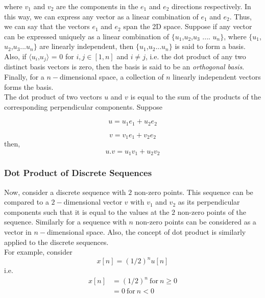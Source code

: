     where $v_1$ and $v_2$ are the components in the $e_1$ and $e_2$ directions respectively. In this way, we can express any vector as a linear combination of $e_1$ and $e_2$. Thus, we can say that the vectors $e_1$ and $e_2$ span the 2D space.
    Suppose if any vector can be expressed uniquely as a linear combination of $\{ u_1$,$u_2$,$u_3$ .... $u_n \}$, where $\{ u_1$,$u_2$,$u_3$...$u_n \}$ are linearly independent, then $\{ u_1$,$u_2$...$u_n \}$ is said to form a basis.\\
\noindent
Also, if $\langle u_i$,$u_j \rangle$ = 0 for $i,j \in [1,n]$ and $i \neq j$, i.e. the dot product of any two distinct basis vectors is zero,  then the basis is said to be an \emph{orthogonal basis}. Finally, for a $n-$dimensional space, a collection of $n$ linearly independent vectors forms the basis.\\
\noindent
The dot product of two vectors $u$ and $v$ is equal to the sum of the products of the corresponding perpendicular components. Suppose

				\begin{equation*}u = u_1e_1 + u_2e_2\end{equation*}
                        
                        \begin{equation*}v = v_1e_1 + v_2e_2\end{equation*} 
\noindent                        
                        then,\begin{equation*} u.v = u_1v_1 + u_2v_2\end{equation*}
           
\subsubsection{Dot Product of Discrete Sequences}           
Now, consider a discrete sequence with $2$ non-zero points. This sequence can be compared to a $2-$dimensional vector $v$ with $v_1$ and $v_2$ as its perpendicular components such that it is equal to the values at the $2$ non-zero points of the sequence. Similarly for a sequence with $n$ non-zero points can be considered as a vector in $n-$dimensional space. Also, the concept of dot product is similarly applied to the discrete sequences.\\
For example, consider
\begin{equation*}
  x[n] = (1/2)^n u[n]
\end{equation*}
    i.e.
\begin{align*}
  x[n] &= (1/2)^n	\ \text{for} \ n\geq0 \\
  &= 0 \ \text{for} \ n<0
\end{align*}

